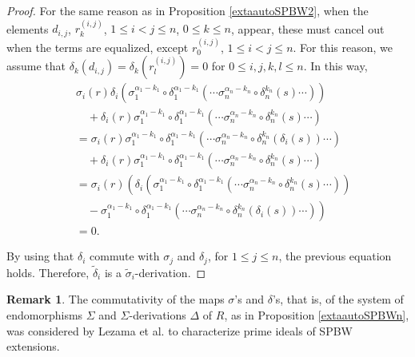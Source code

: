 \documentclass{amsart}
\theoremstyle{definition}
\newtheorem{remark}[theorem]{Remark}
\theoremstyle{remark}
\numberwithin{equation}{section}
\begin{document}
\begin{proof}
For the same reason as in Proposition \ref{extaautoSPBW2}, when the elements $d_{i,j}$, $r_k^{(i,j)}$, $1\leq i < j \leq n$, $0 \leq k \leq n$, appear, these must cancel out when the terms are equalized, except $r_0^{(i,j)}$, $1\leq i < j \leq n$. For this reason, we assume that $\delta_k(d_{i,j})=\delta_k(r_l^{(i,j)})=0$ for $0\leq i, j, k, l \leq n$. In this way, 
\begin{align*}
    &\ \sigma_i(r)\delta_i\left(\sigma_1^{\alpha_{1}-k_1}\circ \delta_1^{\alpha_{1}-k_1}\left(\cdots\sigma_{n}^{\alpha_{n}-k_n}\circ\delta_n^{k_n}(s)\cdots\right)\right) \\
    &\ \quad  + \delta_i(r)\sigma_1^{\alpha_{1}-k_1}\circ \delta_1^{\alpha_{1}-k_1}\left(\cdots\sigma_{n}^{\alpha_{n}-k_n}\circ\delta_n^{k_n}(s)\cdots\right) \\
    &\ =\sigma_i(r)\sigma_1^{\alpha_{1}-k_1}\circ \delta_1^{\alpha_{1}-k_1}\left(\cdots\sigma_{n}^{\alpha_{n}-k_n}\circ\delta_n^{k_n}(\delta_i(s))\cdots\right) \\
    &\ \quad + \delta_i(r)\sigma_1^{\alpha_{1}-k_1}\circ \delta_1^{\alpha_{1}-k_1}\left(\cdots\sigma_{n}^{\alpha_{n}-k_n}\circ\delta_n^{k_n}(s)\cdots\right) \\
    &\ = \sigma_i(r)\left(\delta_i\left(\sigma_1^{\alpha_{1}-k_1}\circ \delta_1^{\alpha_{1}-k_1}\left(\cdots\sigma_{n}^{\alpha_{n}-k_n}\circ\delta_n^{k_n}(s)\cdots\right)\right) \right. \\
    &\ \quad - \left. \sigma_1^{\alpha_{1}-k_1}\circ \delta_1^{\alpha_{1}-k_1}\left(\cdots\sigma_{n}^{\alpha_{n}-k_n}\circ\delta_n^{k_n}(\delta_i(s))\cdots\right)\right) \\
    &\ =  0.
\end{align*}

By using that $\delta_i$ commute with $\sigma_j$ and $\delta_j$, for $1\leq j \leq n$, the previous equation holds. Therefore, $\widetilde{\delta}_i$ is a $\widetilde{\sigma}_i$-derivation.
\end{proof}

\begin{remark}
    The commutativity of the maps $\sigma$'s and $\delta$'s, that is, of the system of endomorphisms $\Sigma$ and $\Sigma$-derivations $\Delta$ of $R$, as in Proposition \ref{extaautoSPBWn}, was considered by Lezama et al. \cite{LezamaAcostaReyes2015} to characterize prime ideals of SPBW extensions.
\end{remark}

\end{document}

